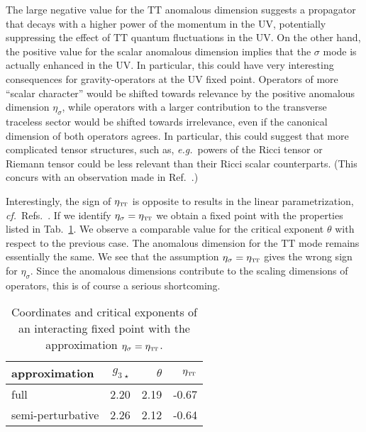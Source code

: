 \documentclass[11pt]{book}
\newcommand\TTspace{ -1pt }
\newcommand\etaTT{ \eta_{\scriptscriptstyle{\mathrm{T\hspace{\TTspace}T}}} }
\newcommand\eg{\textit{e.g.}\ }
\newcommand\cf{\textit{cf.}\ }
\numberwithin{equation}{chapter}
\begin{document}
The large negative value for the $\mathrm{TT}$ anomalous dimension suggests a propagator that decays with a
higher power of the momentum in the UV, potentially suppressing the effect of $\mathrm{TT}$ quantum
fluctuations in the UV.
On the other hand, the positive value for the scalar anomalous dimension implies that the
$\sigma$ mode is actually enhanced in the UV.
In particular, this could have very interesting consequences for gravity-operators at the UV fixed point.
Operators of more ``scalar character'' would be shifted towards relevance by the positive anomalous
dimension $\eta_{\sigma}$, while operators with a larger contribution to the transverse traceless sector
would be shifted towards irrelevance, even if the canonical dimension of both operators agrees.
In particular, this could suggest that more complicated tensor structures,
such as, \eg powers of the Ricci tensor or Riemann tensor could be less relevant than their
Ricci scalar counterparts.
(This concurs with an observation made in Ref.~\cite{Codello:2006in}.)

Interestingly, the sign of $\etaTT$ is opposite to results in the
linear parametrization, \cf Refs.~\cite{Codello:2013fpa, Dona:2013qba, Christiansen:2014raa}.
If we identify $\eta_{\sigma} = \etaTT$ we obtain a fixed point with the properties
listed in Tab.~\ref{puregravityFPetaapprox}.
We observe a comparable value for the critical exponent $\theta$ with  respect to the previous case.
The anomalous dimension for the $\mathrm{TT}$ mode remains essentially the same.
We see that the assumption $\eta_{\sigma}=\etaTT$ gives the wrong sign for $\eta_\sigma$.
Since the anomalous dimensions contribute to the scaling dimensions of operators,
this is of course a serious shortcoming.

\begin{table}
  \begin{center}
  \begin{tabular}{ l r r r }
    \toprule
    approximation     & $g_{3\,\star}$ & $\theta$ & $\etaTT$ \\
    \midrule
    full              & 2.20          & 2.19     & -0.67 \\
    semi-perturbative & 2.26          & 2.12     & -0.64 \\
    \bottomrule
  \end{tabular}
  \end{center}
  \caption[Coordinates and critical exponents of fixed points]
  {
    Coordinates and critical exponents of an interacting fixed point with the
    approximation $\eta_{\sigma} = \etaTT$.
  }
  \label{puregravityFPetaapprox}
\end{table}
\end{document}
